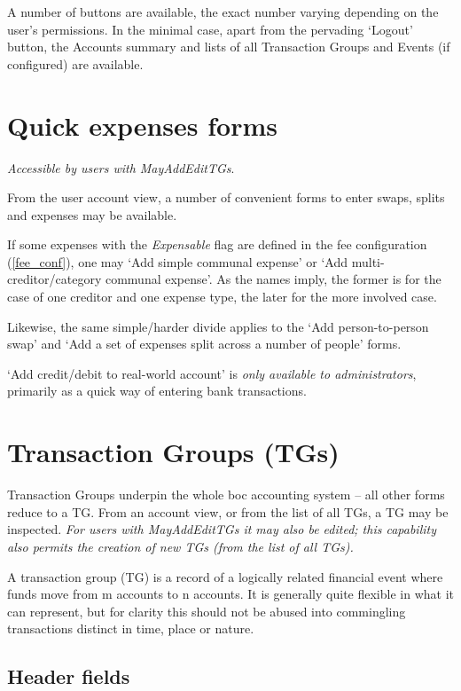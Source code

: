 \documentclass{report}
\begin{document}
A number of buttons are available, the exact number varying depending on the user's permissions.  In the minimal case, apart from the pervading `Logout' button, the Accounts summary and lists of all Transaction Groups and Events (if configured) are available.

\section{Quick expenses forms}

\emph{Accessible by users with MayAddEditTGs}.

From the user account view, a number of convenient forms to enter swaps, splits and expenses may be available.

If some expenses with the \textit{Expensable} flag are defined in the fee configuration (\autoref{fee_conf}), one may `Add simple communal expense' or `Add multi-creditor/category communal expense'.  As the names imply, the former is for the case of one creditor and one expense type, the later for the more involved case.

Likewise, the same simple/harder divide applies to the `Add person-to-person swap' and `Add a set of expenses split across a number of people' forms.

`Add credit/debit to real-world account' is \emph{only available to administrators}, primarily as a quick way of entering bank transactions.

\section{Transaction Groups (TGs)}

Transaction Groups underpin the whole boc accounting system -- all other forms reduce to a TG.  From an account view, or from the list of all TGs, a TG may be inspected.  \emph{For users with MayAddEditTGs it may also be edited; this capability also permits the creation of new TGs (from the list of all TGs).}

A transaction group (TG) is a record of a logically related financial event where funds move from m accounts to n accounts. It is generally quite flexible in what it can represent, but for clarity this should not be abused into commingling transactions distinct in time, place or nature.

\subsection{Header fields}
\end{document}
